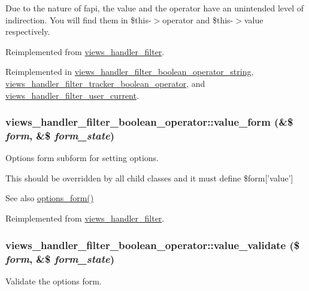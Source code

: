 Due to the nature of fapi, the value and the operator have an unintended level of indirection. You will find them in \$this-\/$>$operator and \$this-\/$>$value respectively. 

Reimplemented from \hyperlink{classviews__handler__filter_a8e513b3abbc2559f37b550ca4957b4ae}{views\_\-handler\_\-filter}.

Reimplemented in \hyperlink{classviews__handler__filter__boolean__operator__string_ad4d0444476749372e38591ad058ee1cd}{views\_\-handler\_\-filter\_\-boolean\_\-operator\_\-string}, \hyperlink{classviews__handler__filter__tracker__boolean__operator_aa359173355e1a3094423882ac5af5897}{views\_\-handler\_\-filter\_\-tracker\_\-boolean\_\-operator}, and \hyperlink{classviews__handler__filter__user__current_a6002cf25d2385bd07c771f9a65cee48f}{views\_\-handler\_\-filter\_\-user\_\-current}.\hypertarget{classviews__handler__filter__boolean__operator_a1680256640c960fef88ad1485cfb91f7}{
\subsubsection[{value\_\-form}]{\setlength{\rightskip}{0pt plus 5cm}views\_\-handler\_\-filter\_\-boolean\_\-operator::value\_\-form (\&\$ {\em form}, \/  \&\$ {\em form\_\-state})}}
\label{classviews__handler__filter__boolean__operator_a1680256640c960fef88ad1485cfb91f7}
Options form subform for setting options.

This should be overridden by all child classes and it must define \$form\mbox{[}'value'\mbox{]}

\begin{DoxySeeAlso}{See also}
\hyperlink{classviews__handler__filter_af14c69367162057a32709a6340de0988}{options\_\-form()} 
\end{DoxySeeAlso}


Reimplemented from \hyperlink{classviews__handler__filter_a9168b39edae84b20e01a3fd0d810ba66}{views\_\-handler\_\-filter}.\hypertarget{classviews__handler__filter__boolean__operator_a9c61464d97fb29d4a481e30f97cb50f9}{
\subsubsection[{value\_\-validate}]{\setlength{\rightskip}{0pt plus 5cm}views\_\-handler\_\-filter\_\-boolean\_\-operator::value\_\-validate (\$ {\em form}, \/  \&\$ {\em form\_\-state})}}
\label{classviews__handler__filter__boolean__operator_a9c61464d97fb29d4a481e30f97cb50f9}
Validate the options form. 

